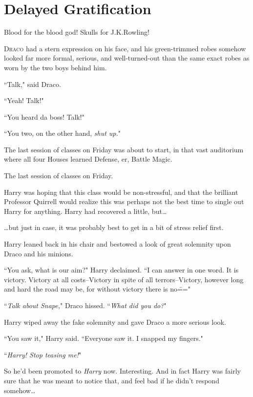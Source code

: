\chapter{Delayed Gratification}

\begin{chapterOpeningAuthorNote}
Blood for the blood god! Skulls for J.\?K.\?Rowling!
\end{chapterOpeningAuthorNote}

\lettrine{D}{raco} had a stern expression on his face, and his green-trimmed robes somehow looked far more formal, serious, and well-turned-out than the same exact robes as worn by the two boys behind him.

``Talk," said Draco.

``Yeah! Talk!"

``You heard da boss! Talk!"

``You two, on the other hand, \emph{shut up.}"

The last session of classes on Friday was about to start, in that vast auditorium where all four Houses learned Defense, er, Battle Magic.

The last session of classes on Friday.

Harry was hoping that this class would be non-stressful, and that the brilliant Professor Quirrell would realize this was perhaps not the best time to single out Harry for anything. Harry had recovered a little, but{\ldots}

{\ldots}but just in case, it was probably best to get in a bit of stress relief first.

Harry leaned back in his chair and bestowed a look of great solemnity upon Draco and his minions.

``You ask, what is our aim?" Harry declaimed. ``I can answer in one word. It is victory. Victory at all costs\---Victory in spite of all terrors\---Victory, however long and hard the road may be, for without victory there is no\==="

``\emph{Talk about Snape,}" Draco hissed. ``\emph{What did you do?}"

Harry wiped away the fake solemnity and gave Draco a more serious look.

``You saw it," Harry said. ``Everyone saw it. I snapped my fingers."

``\emph{Harry! Stop teasing me!}"

So he'd been promoted to \emph{Harry} now. Interesting. And in fact Harry was fairly sure that he was meant to notice that, and feel bad if he didn't respond somehow{\ldots}

